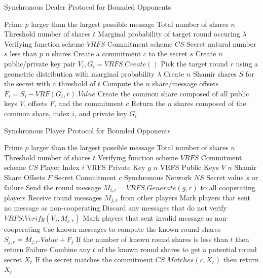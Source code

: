 \documentclass{dalcsthesis}
\begin{document}
\begin{algorithm}
  \caption{Synchronous Dealer Protocol for Bounded Opponents}
  \label{alg:SB_Dealer}
  \begin{algorithmic}[1]
    \INPUT Prime $p$ larger than the largest possible message
    \INPUT Total number of shares $n$
    \INPUT Threshold number of shares $t$
    \INPUT Marginal probability of target round occuring $\lambda$
    \INPUT Verifying function scheme $VRFS$
    \INPUT Commitment scheme $CS$
    \INPUT Secret natural number $s$ less than $p$
    \OUTPUT $n$ shares
    \STATE Create a commitment $c$ to the secret $s$
    \STATE Create $n$ public/private key pair $V_i, G_i = VRFS.Create()$
    \STATE Pick the target round $r$ using a geometric distribution with marginal probability $\lambda$
    \STATE Create $n$ Shamir shares $S$ for the secret with a threshold of $t$
    \STATE Compute the $n$ share/message offsets $F_i = S_i - VRF(G_i, r).Value$
    \STATE Create the common share composed of all public keys $V$, offsets $F$, and the commitment $c$
    \STATE Return the $n$ shares composed of the common share, index $i$, and private key $G_i$
  \end{algorithmic}
\end{algorithm}
\begin{algorithm}
  \caption{Synchronous Player Protocol for Bounded Opponents}
  \label{alg:SB_Player}
  \begin{algorithmic}[1]
    \INPUT Prime $p$ larger than the largest possible message
    \INPUT Total number of shares $n$
    \INPUT Threshold number of shares $t$
    \INPUT Verifying function scheme $VRFS$
    \INPUT Commitment scheme $CS$
    \INPUT Player Index $i$
    \INPUT VRFS Private Key $g$
    \INPUT $n$ VRFS Public Keys $V$
    \INPUT $n$ Shamir Share Offsets $F$
    \INPUT Secret Commitment $c$
    \INPUT Synchronous Network $NS$
    \OUTPUT Secret value $s$ or failure
      \STATE Send the round message $M_{i,r} = VRFS.Generate(g, r)$ to all cooperating players
      \STATE Receive round messages $M_{j,r}$ from other players
      \STATE Mark players that sent no message as non-cooperating
      \STATE Discard any messages that do not verify $VRFS.Verify(V_j, M_{j,r})$
      \STATE Mark players that sent invalid message as non-cooperating
      \STATE Use known messages to compute the known round shares $S_{j,r} = M_{j,r}.Value + F_j$
      \STATE If the number of known round shares is less than $t$ then return Failure
      \STATE Combine any $t$ of the known round shares to get a potential round secret $X_r$
      \STATE If the secret matches the commitment $CS.Matches(c, X_r)$ then return $X_r$
    \ENDFOR
  \end{algorithmic}
\end{algorithm}
\end{document}
